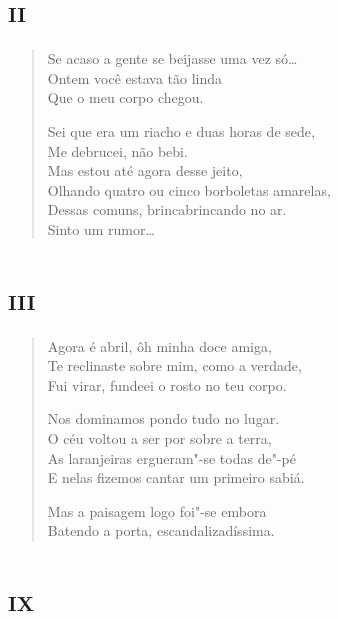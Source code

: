 \chapter[«Se acaso a gente se beijasse uma vez só\ldots{}»]{\textsc{ii}}

\begin{verse}
Se acaso a gente se beijasse uma vez só\ldots{}\\
Ontem você estava tão linda\\
Que o meu corpo chegou.

Sei que era um riacho e duas horas de sede,\\
Me debrucei, não bebi.\\
Mas estou até agora desse jeito,\\
Olhando quatro ou cinco borboletas amarelas,\\
Dessas comuns, brincabrincando no ar.\\
Sinto um rumor\ldots{}
\end{verse}

\chapter[«Agora é abril, ôh minha doce amiga»]{\textsc{iii}}

\begin{verse}
Agora é abril, ôh minha doce amiga,\\
Te reclinaste sobre mim, como a verdade,\\
Fui virar, fundeei o rosto no teu corpo.

Nos dominamos pondo tudo no lugar.\\
O céu voltou a ser por sobre a terra,\\
As laranjeiras ergueram"-se todas de"-pé\\
E nelas fizemos cantar um primeiro sabiá.

Mas a paisagem logo foi"-se embora\\
Batendo a porta, escandalizadíssima.
\end{verse}

\chapter[«Vossos olhos são um mate costumeiro»]{\textsc{ix}}

